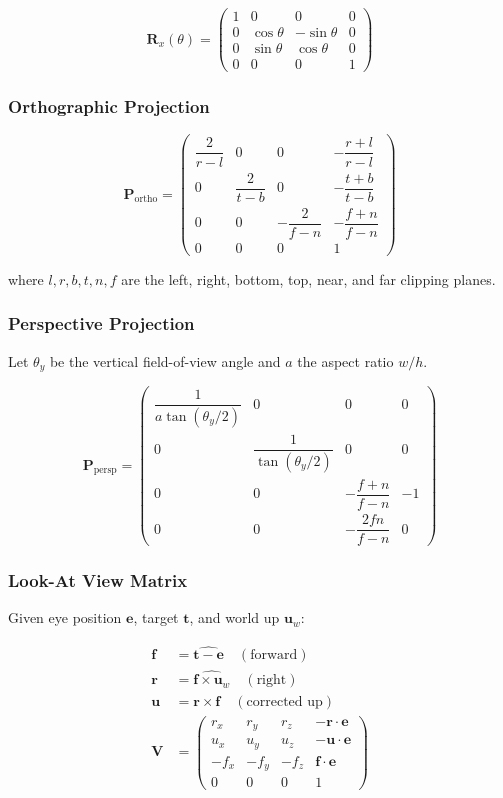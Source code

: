 \[
\mathbf{R}_x(\theta) =
\begin{pmatrix}
1 & 0          & 0           & 0 \\
0 & \cos\theta & -\sin\theta & 0 \\
0 & \sin\theta &  \cos\theta & 0 \\
0 & 0          & 0           & 1
\end{pmatrix}
\]

\subsubsection{Orthographic Projection}

\[
\mathbf{P}_\text{ortho} =
\begin{pmatrix}
\dfrac{2}{r-l} & 0 & 0 & -\dfrac{r+l}{r-l} \\[6pt]
0 & \dfrac{2}{t-b} & 0 & -\dfrac{t+b}{t-b} \\[6pt]
0 & 0 & -\dfrac{2}{f-n} & -\dfrac{f+n}{f-n} \\[6pt]
0 & 0 & 0 & 1
\end{pmatrix}
\]

where $l, r, b, t, n, f$ are the left, right, bottom, top, near, and far
clipping planes.

\subsubsection{Perspective Projection}

Let $\theta_y$ be the vertical field-of-view angle and $a$ the
aspect ratio $w/h$.

\[
\mathbf{P}_\text{persp} =
\begin{pmatrix}
\dfrac{1}{a \tan(\theta_y/2)} & 0 & 0 & 0 \\[8pt]
0 & \dfrac{1}{\tan(\theta_y/2)} & 0 & 0 \\[8pt]
0 & 0 & -\dfrac{f+n}{f-n} & -1 \\[4pt]
0 & 0 & -\dfrac{2fn}{f-n} & 0
\end{pmatrix}
\]

\subsubsection{Look-At View Matrix}

Given eye position $\mathbf{e}$, target $\mathbf{t}$, and world up
$\mathbf{u}_w$:

\begin{align}
\mathbf{f} &= \widehat{\mathbf{t} - \mathbf{e}} \quad (\text{forward}) \\
\mathbf{r} &= \widehat{\mathbf{f} \times \mathbf{u}_w} \quad (\text{right}) \\
\mathbf{u} &= \mathbf{r} \times \mathbf{f} \quad (\text{corrected up}) \\
\mathbf{V} &=
\begin{pmatrix}
r_x & r_y & r_z & -\mathbf{r}\cdot\mathbf{e} \\
u_x & u_y & u_z & -\mathbf{u}\cdot\mathbf{e} \\
-f_x & -f_y & -f_z & \mathbf{f}\cdot\mathbf{e} \\
0 & 0 & 0 & 1
\end{pmatrix}
\end{align}

